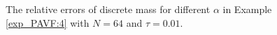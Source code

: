 \begin{figure}[H]
\begin{center}
 \caption{The relative errors of discrete mass for different $\alpha$ in Example \ref{exp_PAVF:4} with $N = 64$ and $\tau=0.01$.} \label{fig_PAVF:11}
\end{center}
\end{figure}


